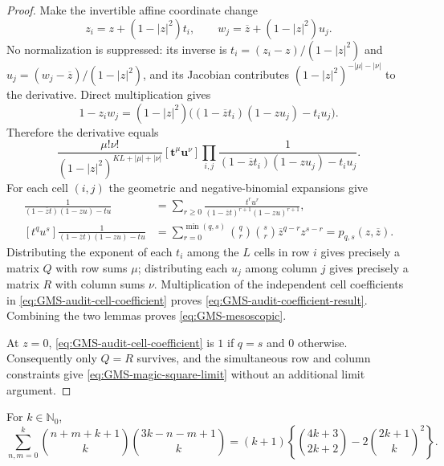 \begin{proof}
Make the invertible affine coordinate change
\begin{equation}
 z_i=z+(1-|z|^2)t_i,
 \qquad
 w_j=\overline z+(1-|z|^2)u_j.
 \label{eq:GMS-audit-affine-change}
\end{equation}
No normalization is suppressed: its inverse is
$t_i=(z_i-z)/(1-|z|^2)$ and $u_j=(w_j-\overline z)/(1-|z|^2)$, and its
Jacobian contributes $(1-|z|^2)^{-|\mu|-|\nu|}$ to the derivative.  Direct multiplication
gives
\begin{equation}
 1-z_iw_j=(1-|z|^2)
 \bigl((1-\overline zt_i)(1-zu_j)-t_iu_j\bigr).
 \label{eq:GMS-audit-denominator-change}
\end{equation}
Therefore the derivative equals
\begin{equation}
 \frac{\mu!\nu!}{(1-|z|^2)^{KL+|\mu|+|\nu|}}
 [\mathbf t^\mu\mathbf u^\nu]
 \prod_{i,j}
 \frac1{(1-\overline zt_i)(1-zu_j)-t_iu_j}.
 \label{eq:GMS-audit-coefficient-operator}
\end{equation}
For each cell $(i,j)$ the geometric and negative-binomial expansions give
\begin{align}
 \frac1{(1-\overline zt)(1-zu)-tu}
 &=\sum_{r\geq0}
 \frac{t^ru^r}{(1-\overline zt)^{r+1}(1-zu)^{r+1}},\\
 [t^q u^s]\frac1{(1-\overline zt)(1-zu)-tu}
 &=\sum_{r=0}^{\min(q,s)}
 \binom qr\binom sr\overline z^{q-r}z^{s-r}
 =p_{q,s}(z,\overline z).
 \label{eq:GMS-audit-cell-coefficient}
\end{align}
Distributing the exponent of each $t_i$ among the $L$ cells in row $i$ gives precisely a
matrix $Q$ with row sums $\mu$; distributing each $u_j$ among column $j$ gives precisely a
matrix $R$ with column sums $\nu$.  Multiplication of the independent cell coefficients in
\eqref{eq:GMS-audit-cell-coefficient} proves \eqref{eq:GMS-audit-coefficient-result}.
Combining the two lemmas proves \eqref{eq:GMS-mesoscopic}.

At $z=0$, \eqref{eq:GMS-audit-cell-coefficient} is $1$ if $q=s$ and $0$ otherwise.
Consequently only $Q=R$ survives, and the simultaneous row and column constraints give
\eqref{eq:GMS-magic-square-limit} without an additional limit argument.
\end{proof}

\begin{lemma}
\label{lem:GMS-audit-hk-sum}
For $k\in\mathbb N_0$,
\begin{equation}
 \sum_{n,m=0}^{k}
 \binom{n+m+k+1}{k}\binom{3k-n-m+1}{k}
 =(k+1)\left\{\binom{4k+3}{2k+2}
 -2\binom{2k+1}{k}^{2}\right\}.
 \label{eq:GMS-audit-finite-binomial-sum}
\end{equation}
\end{lemma}

